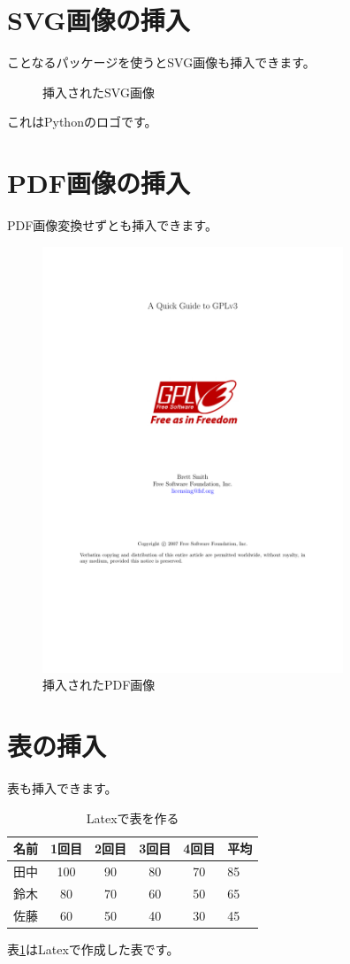 \section{SVG画像の挿入}
ことなるパッケージを使うとSVG画像も挿入できます。

\begin{figure}[H]
    \centering
    
    \caption{挿入されたSVG画像}
    \label{fig:svg}
\end{figure}
これはPythonのロゴです。

\section{PDF画像の挿入}
PDF画像変換せずとも挿入できます。
\begin{figure}[H]
    \centering
    \includegraphics[width=9cm, page=2]{figures/quick-guide-gplv3.pdf}
    \caption{挿入されたPDF画像}
    \label{fig:pdf1}
\end{figure}

\section{表の挿入}
表も挿入できます。
\begin{table}[H]
    \centering
    \begin{tabular}{lccccl}
        \toprule
        名前 & 1回目 & 2回目 & 3回目 & 4回目 & 平均 \\
        \midrule
        田中 & 100   & 90    & 80    & 70    & 85   \\
        鈴木 & 80    & 70    & 60    & 50    & 65   \\
        佐藤 & 60    & 50    & 40    & 30    & 45   \\
        \bottomrule
    \end{tabular}
    \caption{Latexで表を作る}
    \label{tab:latex_table}
\end{table}
表\ref{tab:latex_table}はLatexで作成した表です。